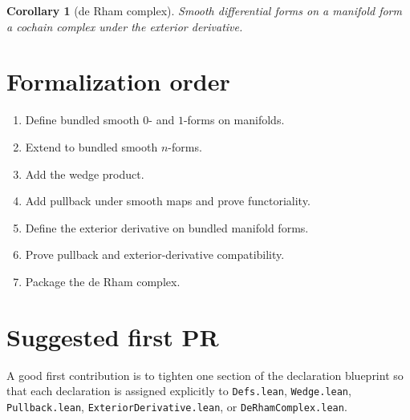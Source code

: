 \documentclass[11pt]{article}
\newtheorem{corollary}[definition]{Corollary}
\begin{document}
\begin{corollary}[de Rham complex]\label{cor:de-rham-complex}
Smooth differential forms on a manifold form a cochain complex under the
exterior derivative.
\end{corollary}

\section{Formalization order}

\begin{enumerate}
\item Define bundled smooth $0$- and $1$-forms on manifolds.
\item Extend to bundled smooth $n$-forms.
\item Add the wedge product.
\item Add pullback under smooth maps and prove functoriality.
\item Define the exterior derivative on bundled manifold forms.
\item Prove pullback and exterior-derivative compatibility.
\item Package the de Rham complex.
\end{enumerate}

\section{Suggested first PR}

A good first contribution is to tighten one section of the declaration
blueprint so that each declaration is assigned explicitly to
\texttt{Defs.lean}, \texttt{Wedge.lean}, \texttt{Pullback.lean},
\texttt{ExteriorDerivative.lean}, or \texttt{DeRhamComplex.lean}.
\end{document}
